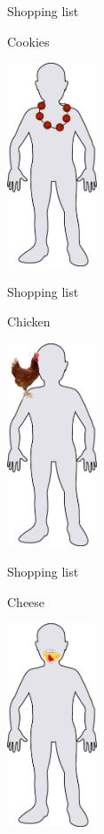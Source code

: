 \begin{frame}{Shopping list}
  \begin{block}{Cookies}
    \begin{center}
      \includegraphics[height=6cm]{img/body/body-06.jpg}
    \end{center}
  \end{block}
\end{frame}

\begin{frame}{Shopping list}
  \begin{block}{Chicken}
    \begin{center}
      \includegraphics[height=6cm]{img/body/body-07.jpg}
    \end{center}
  \end{block}
\end{frame}

\begin{frame}{Shopping list}
  \begin{block}{Cheese}
    \begin{center}
      \includegraphics[height=6cm]{img/body/body-08.jpg}
    \end{center}
  \end{block}
\end{frame}

